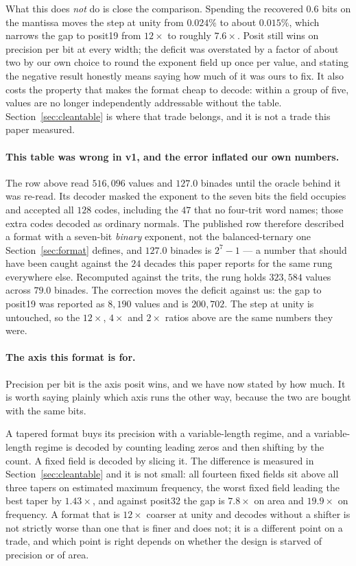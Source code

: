 \documentclass[11pt]{article}
\theoremstyle{definition}
\begin{document}
What this does \emph{not} do is close the comparison. Spending the recovered
$0.6$ bits on the mantissa moves the step at unity from $0.024\%$ to about
$0.015\%$, which narrows the gap to posit19 from $12\times$ to roughly
$7.6\times$. Posit still wins on precision per bit at every width; the deficit
was overstated by a factor of about two by our own choice to round the exponent
field up once per value, and stating the negative result honestly means saying
how much of it was ours to fix. It also costs the property that makes the format
cheap to decode: within a group of five, values are no longer independently
addressable without the table. Section~\ref{sec:cleantable} is where that trade belongs, and it is not a trade
this paper measured.

\paragraph{This table was wrong in v1, and the error inflated our own numbers.}
The row above read $516{,}096$ values and $127.0$ binades until the oracle
behind it was re-read. Its decoder masked the exponent to the seven bits the
field occupies and accepted all $128$ codes, including the $47$ that no
four-trit word names; those extra codes decoded as ordinary normals. The
published row therefore described a format with a seven-bit \emph{binary}
exponent, not the balanced-ternary one Section~\ref{sec:format} defines, and
$127.0$ binades is $2^7-1$ --- a number that should have been caught against the
$24$ decades this paper reports for the same rung everywhere else. Recomputed
against the trits, the rung holds $323{,}584$ values across $79.0$ binades.
The correction moves the deficit against us: the gap to posit19 was reported as
$8{,}190$ values and is $200{,}702$. The step at unity is untouched, so the
$12\times$, $4\times$ and $2\times$ ratios above are the same numbers they were.

\paragraph{The axis this format is for.} Precision per bit is the axis posit
wins, and we have now stated by how much. It is worth saying plainly which axis
runs the other way, because the two are bought with the same bits.

A tapered format buys its precision with a variable-length regime, and a
variable-length regime is decoded by counting leading zeros and then shifting by
the count. A fixed field is decoded by slicing it. The difference is measured in
Section~\ref{sec:cleantable} and it is not small: all fourteen fixed fields sit
above all three tapers on estimated maximum frequency, the worst fixed field
leading the best taper by $1.43\times$, and against posit32 the gap is
$7.8\times$ on area and $19.9\times$ on frequency. A format that is $12\times$
coarser at unity and decodes without a shifter is not strictly worse than one
that is finer and does not; it is a different point on a trade, and which point
is right depends on whether the design is starved of precision or of area.
\end{document}
